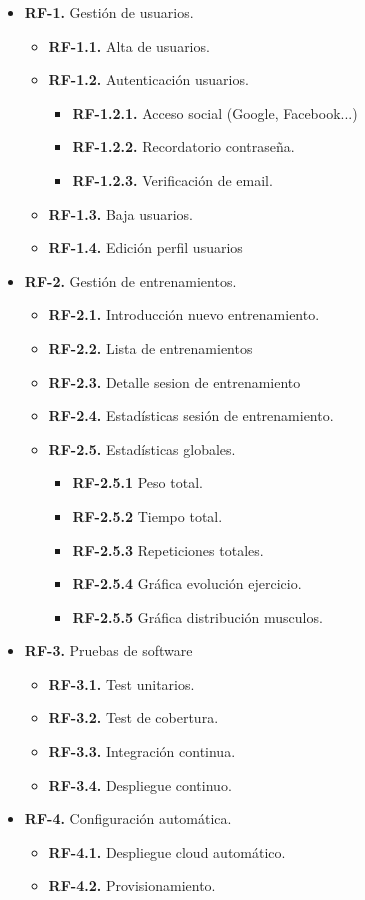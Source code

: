 \begin{itemize}
  \item \textbf{RF-1.} Gestión de usuarios.
  \begin{itemize}
    \item \textbf{RF-1.1.} Alta de usuarios.
    \item \textbf{RF-1.2.} Autenticación usuarios.
    \begin{itemize}
      \item \textbf{RF-1.2.1.} Acceso social (Google, Facebook...)
      \item \textbf{RF-1.2.2.} Recordatorio contraseña.
      \item \textbf{RF-1.2.3.} Verificación de email.
    \end{itemize}
    \item \textbf{RF-1.3.} Baja usuarios.
    \item \textbf{RF-1.4.} Edición perfil usuarios
  \end{itemize}
  \item \textbf{RF-2.} Gestión de entrenamientos.
  \begin{itemize}
    \item \textbf{RF-2.1.} Introducción nuevo entrenamiento.
    \item \textbf{RF-2.2.} Lista de entrenamientos
    \item \textbf{RF-2.3.} Detalle sesion de entrenamiento
    \item \textbf{RF-2.4.} Estadísticas sesión de entrenamiento.
    \item \textbf{RF-2.5.} Estadísticas globales.
    \begin{itemize}
      \item \textbf{RF-2.5.1} Peso total.
      \item \textbf{RF-2.5.2} Tiempo total.
      \item \textbf{RF-2.5.3} Repeticiones totales.
      \item \textbf{RF-2.5.4} Gráfica evolución ejercicio.
      \item \textbf{RF-2.5.5} Gráfica distribución musculos.
    \end{itemize}
  \end{itemize}
  \item \textbf{RF-3.} Pruebas de software
  \begin{itemize}
    \item \textbf{RF-3.1.} Test unitarios.
    \item \textbf{RF-3.2.} Test de cobertura.
    \item \textbf{RF-3.3.} Integración continua.
    \item \textbf{RF-3.4.} Despliegue continuo.
  \end{itemize}
  \item \textbf{RF-4.} Configuración automática.
  \begin{itemize}
    \item \textbf{RF-4.1.} Despliegue cloud automático.
    \item \textbf{RF-4.2.} Provisionamiento.
  \end{itemize}
\end{itemize}

